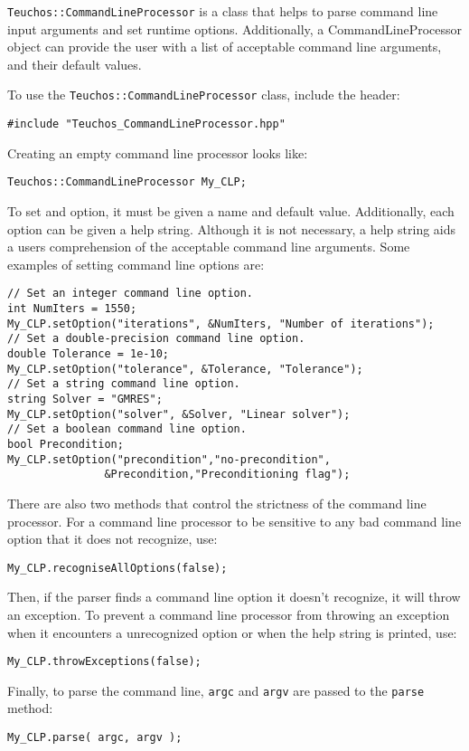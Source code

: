 \verb!Teuchos::CommandLineProcessor! is a class that helps to parse command
line input arguments and set runtime options. Additionally, a CommandLineProcessor
object can provide the user with a list of acceptable command line arguments, and
their default values.

To use the \verb!Teuchos::CommandLineProcessor! class, include the header:
{\small 
\begin{verbatim}
#include "Teuchos_CommandLineProcessor.hpp"
\end{verbatim}}
Creating an empty command line processor looks like:
{\small 
\begin{verbatim}
Teuchos::CommandLineProcessor My_CLP;
\end{verbatim}}
To set and option, it must be given a name and default value.  Additionally,
each option can be given a help string.  Although it is not necessary, a help
string aids a users comprehension of the acceptable command line arguments.
Some examples of setting command line options are:
{\small
\begin{verbatim}    
// Set an integer command line option.
int NumIters = 1550;
My_CLP.setOption("iterations", &NumIters, "Number of iterations");
// Set a double-precision command line option.
double Tolerance = 1e-10;    
My_CLP.setOption("tolerance", &Tolerance, "Tolerance");
// Set a string command line option.
string Solver = "GMRES";
My_CLP.setOption("solver", &Solver, "Linear solver");
// Set a boolean command line option.    
bool Precondition;
My_CLP.setOption("precondition","no-precondition",
               &Precondition,"Preconditioning flag");
\end{verbatim}}
There are also two methods that control the strictness of the command line processor.
For a command line processor to be sensitive to any bad command line option that it does
not recognize, use:
{\small
\begin{verbatim}
My_CLP.recogniseAllOptions(false);
\end{verbatim}}
\noindent Then, if the parser finds a command line option it doesn't recognize, it will
throw an exception.  To prevent a command line processor from throwing an exception when
it encounters a unrecognized option or when the help string is printed, use:
{\small
\begin{verbatim}
My_CLP.throwExceptions(false);
\end{verbatim}}
Finally, to parse the command line, {\tt argc} and {\tt argv} are passed to the {\tt parse} method:
{\small
\begin{verbatim}    
My_CLP.parse( argc, argv );
\end{verbatim}}
